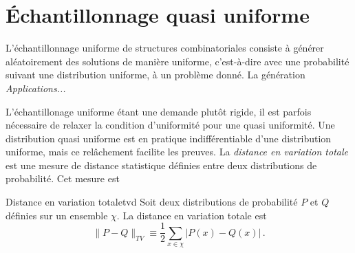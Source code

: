 
\section{Échantillonnage quasi uniforme}

L'échantillonnage uniforme de structures combinatoriales consiste à générer aléatoirement des solutions de manière uniforme, c'est-à-dire avec une probabilité suivant une distribution uniforme, à un problème donné. La génération \textcolor{mydarkred}{\textit{Applications...}}

L'échantillonage uniforme étant une demande plutôt rigide, il est parfois nécessaire de relaxer la condition d'uniformité pour une quasi uniformité. Une distribution quasi uniforme est en pratique indifférentiable d'une distribution uniforme, mais ce relâchement facilite les preuves. La \textit{distance en variation totale} est une mesure de distance statistique définies entre deux distributions de probabilité. Cet mesure est 

\begin{subdefinition}{Distance en variation totale}{tvd}
    Soit deux distributions de probabilité $P$ et $Q$ définies sur un ensemble $\chi$. La distance en variation totale est
    \begin{equation*}
        \lVert P - Q \rVert_{TV} \equiv \frac{1}{2} \sum_{x \in \chi} \lvert P(x) - Q(x) \rvert \,. 
    \end{equation*}
\end{subdefinition}

